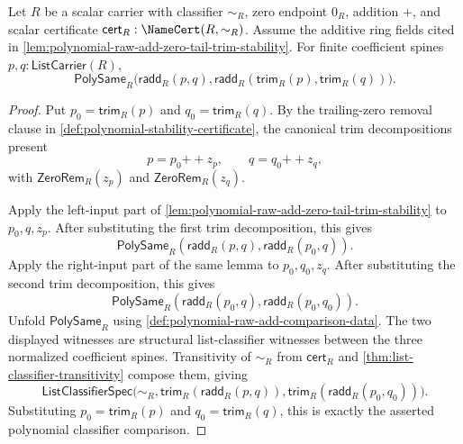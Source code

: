 \begin{theorem}
\label{thm:polynomial-raw-add-two-sided-trim-compatibility}
Let $R$ be a scalar carrier with classifier $\sim_R$, zero endpoint $0_R$, addition $+$, and scalar certificate $\mathsf{cert}_R:\NameCert(R,\sim_R)$. Assume the additive ring fields cited in \autoref{lem:polynomial-raw-add-zero-tail-trim-stability}. For finite coefficient spines $p,q:\mathsf{ListCarrier}(R)$,
$$
\mathsf{PolySame}_R\bigl(\mathsf{radd}_R(p,q),\mathsf{radd}_R(\mathsf{trim}_R(p),\mathsf{trim}_R(q))\bigr).
$$
\end{theorem}
\begin{proof}
Put $p_0=\mathsf{trim}_R(p)$ and $q_0=\mathsf{trim}_R(q)$. By the trailing-zero removal clause in \autoref{def:polynomial-stability-certificate}, the canonical trim decompositions present
$$
p=p_0{++}z_p,
\qquad
q=q_0{++}z_q,
$$
with $\mathsf{ZeroRem}_R(z_p)$ and $\mathsf{ZeroRem}_R(z_q)$.

Apply the left-input part of \autoref{lem:polynomial-raw-add-zero-tail-trim-stability} to $p_0,q,z_p$. After substituting the first trim decomposition, this gives
$$
\mathsf{PolySame}_R(\mathsf{radd}_R(p,q),\mathsf{radd}_R(p_0,q)).
$$
Apply the right-input part of the same lemma to $p_0,q_0,z_q$. After substituting the second trim decomposition, this gives
$$
\mathsf{PolySame}_R(\mathsf{radd}_R(p_0,q),\mathsf{radd}_R(p_0,q_0)).
$$
Unfold $\mathsf{PolySame}_R$ using \autoref{def:polynomial-raw-add-comparison-data}. The two displayed witnesses are structural list-classifier witnesses between the three normalized coefficient spines. Transitivity of $\sim_R$ from $\mathsf{cert}_R$ and \autoref{thm:list-classifier-transitivity} compose them, giving
$$
\mathsf{ListClassifierSpec}\bigl(\sim_R,\mathsf{trim}_R(\mathsf{radd}_R(p,q)),\mathsf{trim}_R(\mathsf{radd}_R(p_0,q_0))\bigr).
$$
Substituting $p_0=\mathsf{trim}_R(p)$ and $q_0=\mathsf{trim}_R(q)$, this is exactly the asserted polynomial classifier comparison.
\end{proof}


